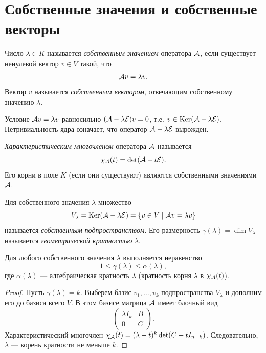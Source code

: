 \documentclass[10pt]{article}
\begin{document}
\section{Собственные значения и собственные векторы}

\begin{definition}
    Число $\lambda \in K$ называется \textit{собственным значением} оператора $\mathcal{A}$, если существует ненулевой вектор $v\in V$ такой, что
    \[
    \mathcal{A} v = \lambda v.
    \]
    Вектор $v$ называется \textit{собственным вектором}, отвечающим собственному значению $\lambda$.
\end{definition}

Условие $\mathcal{A} v = \lambda v$ равносильно $(\mathcal{A} - \lambda \mathcal{E})v = 0$, т.е. $v \in \operatorname{Ker}(\mathcal{A}-\lambda\mathcal{E})$. Нетривиальность ядра означает, что оператор $\mathcal{A}-\lambda\mathcal{E}$ вырожден.

\begin{definition}
    \textit{Характеристическим многочленом} оператора $\mathcal{A}$ называется
    \[
    \chi_{\mathcal{A}}(t) = \det(\mathcal{A} - t\mathcal{E}).
    \]
    Его корни в поле $K$ (если они существуют) являются собственными значениями $\mathcal{A}$.
\end{definition}

\begin{definition}
    Для собственного значения $\lambda$ множество
    \[
    V_\lambda = \operatorname{Ker}(\mathcal{A}-\lambda\mathcal{E}) = \{v\in V \mid \mathcal{A} v = \lambda v\}
    \]
    называется \textit{собственным подпространством}. Его размерность $\gamma(\lambda)=\dim V_\lambda$ называется \textit{геометрической кратностью} $\lambda$.
\end{definition}

\begin{theorem}
    Для любого собственного значения $\lambda$ выполняется неравенство
    \[
    1 \le \gamma(\lambda) \le \alpha(\lambda),
    \]
    где $\alpha(\lambda)$ --- алгебраическая кратность $\lambda$ (кратность корня $\lambda$ в $\chi_{\mathcal{A}}(t)$).
\end{theorem}
\begin{proof}
    Пусть $\gamma(\lambda)=k$. Выберем базис $v_1,\dots,v_k$ подпространства $V_\lambda$ и дополним его до базиса всего $V$. В этом базисе матрица $\mathcal{A}$ имеет блочный вид
    \[
    \begin{pmatrix}
    \lambda I_k & B \\
    0 & C
    \end{pmatrix}.
    \]
    Характеристический многочлен $\chi_{\mathcal{A}}(t)=(\lambda-t)^k \det(C-tI_{n-k})$. Следовательно, $\lambda$ --- корень кратности не меньше $k$.
\end{proof}
\end{document}
